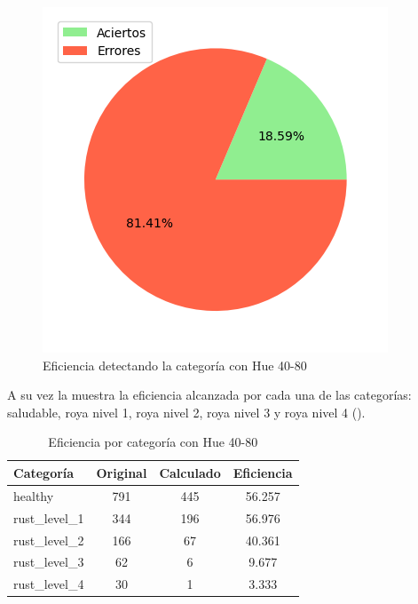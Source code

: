 \begin{figure}
\centering
\includegraphics[scale=0.6]{images/result_global_class_40_80.png}
\caption{Eficiencia detectando la categoría con Hue 40-80}
\label{img:efficiency_category_40_80}
\end{figure}

\captionsetup[figure]{skip=10pt}

A su vez la  muestra la eficiencia alcanzada por cada una de las categorías: saludable, roya nivel 1, roya nivel 2, roya nivel 3 y roya nivel 4 ().

\begin{table}[h!]
\centering
\begin{tabular}{|l|c|c|c|}
\hline 
\textbf{Categoría} & \textbf{Original} & \textbf{Calculado} & \textbf{Eficiencia} \\
\hline
healthy & 791 & 445 & 56.257 \\
\hline 
rust\_level\_1 & 344 & 196 & 56.976 \\
\hline 
rust\_level\_2 & 166 & 67 & 40.361 \\
\hline 
rust\_level\_3 & 62 & 6 & 9.677 \\
\hline 
rust\_level\_4 & 30 & 1 & 3.333 \\
\hline 
\end{tabular}
\caption{Eficiencia por categoría con Hue 40-80}
\label{table:efficiency_categories_40_80}
\end{table}

